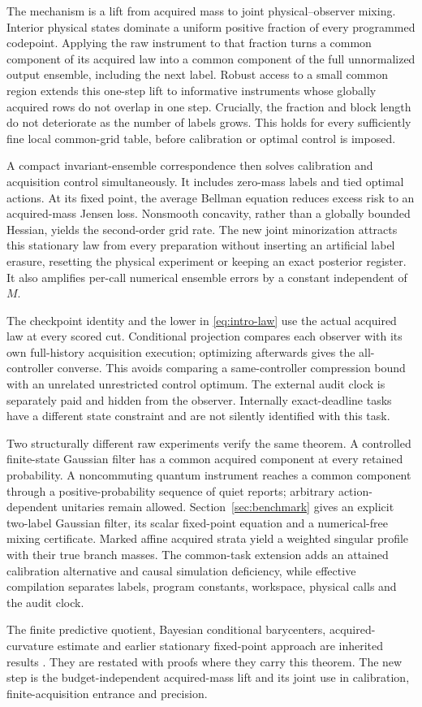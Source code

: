 The mechanism is a lift from acquired mass to joint physical--observer mixing. Interior physical states dominate a uniform positive fraction of every programmed codepoint. Applying the raw instrument to that fraction turns a common component of its acquired law into a common component of the full unnormalized output ensemble, including the next label. Robust access to a small common region extends this one-step lift to informative instruments whose globally acquired rows do not overlap in one step. Crucially, the fraction and block length do not deteriorate as the number of labels grows. This holds for every sufficiently fine local common-grid table, before calibration or optimal control is imposed.

A compact invariant-ensemble correspondence then solves calibration and acquisition control simultaneously. It includes zero-mass labels and tied optimal actions. At its fixed point, the average Bellman equation reduces excess risk to an acquired-mass Jensen loss. Nonsmooth concavity, rather than a globally bounded Hessian, yields the second-order grid rate. The new joint minorization attracts this stationary law from every preparation without inserting an artificial label erasure, resetting the physical experiment or keeping an exact posterior register. It also amplifies per-call numerical ensemble errors by a constant independent of $M$.

The checkpoint identity and the lower in \eqref{eq:intro-law} use the actual acquired law at every scored cut. Conditional projection compares each observer with its own full-history acquisition execution; optimizing afterwards gives the all-controller converse. This avoids comparing a same-controller compression bound with an unrelated unrestricted control optimum. The external audit clock is separately paid and hidden from the observer. Internally exact-deadline tasks have a different state constraint and are not silently identified with this task.

Two structurally different raw experiments verify the same theorem. A controlled finite-state Gaussian filter has a common acquired component at every retained probability. A noncommuting quantum instrument reaches a common component through a positive-probability sequence of quiet reports; arbitrary action-dependent unitaries remain allowed. Section~\ref{sec:benchmark} gives an explicit two-label Gaussian filter, its scalar fixed-point equation and a numerical-free mixing certificate. Marked affine acquired strata yield a weighted singular profile with their true branch masses. The common-task extension adds an attained calibration alternative and causal simulation deficiency, while effective compilation separates labels, program constants, workspace, physical calls and the audit clock.

The finite predictive quotient, Bayesian conditional barycenters, acquired-curvature estimate and earlier stationary fixed-point approach are inherited results \cite{GTFBayes,GTFControlled,GTFStationary}. They are restated with proofs where they carry this theorem. The new step is the budget-independent acquired-mass lift and its joint use in calibration, finite-acquisition entrance and precision.
